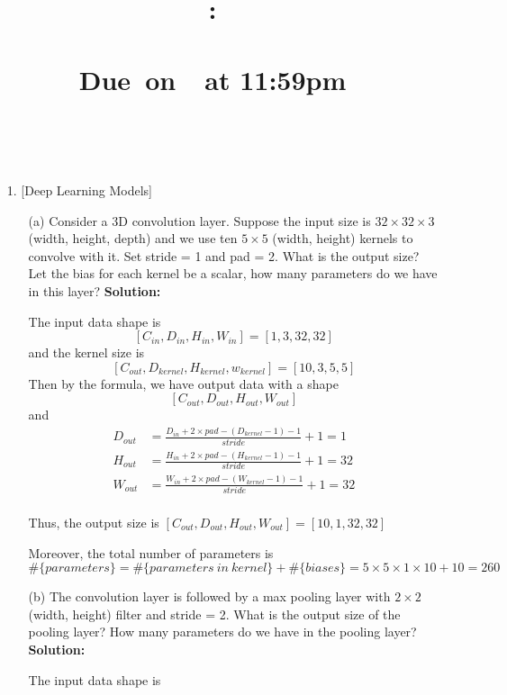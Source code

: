 \documentclass{article}
\title{
    \vspace{2in}
    \textmd{\textbf{\hmwkClass:\\ \hmwkTitle}}\\
    \normalsize\vspace{0.1in}\small{Due\ on\ \hmwkDueDate\ at 11:59pm}\\
    \vspace{0.1in}\large{\textit{\hmwkClassInstructor}}
    \vspace{3in}
}
\author{\textbf{\hmwkAuthorName}\\ \hmwkAuthorID}
\date{}
\begin{document}
    \maketitle
    \pagebreak

    \begin{enumerate}
        \setlength\parindent{2em}
        \item [1.] [{Deep Learning Models}]
        \begin{enumerate}
            \setlength\parindent{2em}
            \item [(a)] Consider a 3D convolution layer.
            Suppose the input size is $32 \times 32 \times 3$ (width, height, depth) and we use ten $5 \times 5$ (width, height) kernels to convolve with it.
            Set stride = 1 and pad = 2.
            What is the output size?
            Let the bias for each kernel be a scalar, how many parameters do we have in this layer?\newline
            {\bf Solution:}
            \par The input data shape is \[[C_{in},D_{in},H_{in},W_{in}] = [1, 3, 32, 32]\] and the kernel size is \[[C_{out}, D_{kernel}, H_{kernel}, w_{kernel}] = [10, 3, 5, 5]\]
            Then by the formula, we have output data with a shape
            \[[C_{out}, D_{out}, H_{out}, W_{out}]\]
            and
            \begin{align*}
                D_{out} &= \frac{D_{in}+2\times pad-(D_{kernel}-1)-1}{stride}+1=1\\
                H_{out} &= \frac{H_{in}+2\times pad-(H_{kernel}-1)-1}{stride}+1=32\\
                W_{out} &= \frac{W_{in}+2\times pad-(W_{kernel}-1)-1}{stride}+1=32\\
            \end{align*}
            \par Thus, the output size is $[C_{out}, D_{out}, H_{out}, W_{out}]=[10,1,32,32]$
            \par Moreover, the total number of parameters is
            \[\#\{parameters\}=\#\{parameters\ in\ kernel\}+\#\{biases\} = 5\times 5\times 1\times 10 + 10=260\]
            \item [(b)] The convolution layer is followed by a max pooling layer with $2 \times 2$ (width, height) filter and stride = 2. What is the output size of the pooling layer? How many parameters do we have in the pooling layer?\newline
            {\bf Solution:}
            \par The input data shape is

\end{enumerate}
\end{enumerate}
\end{document}
